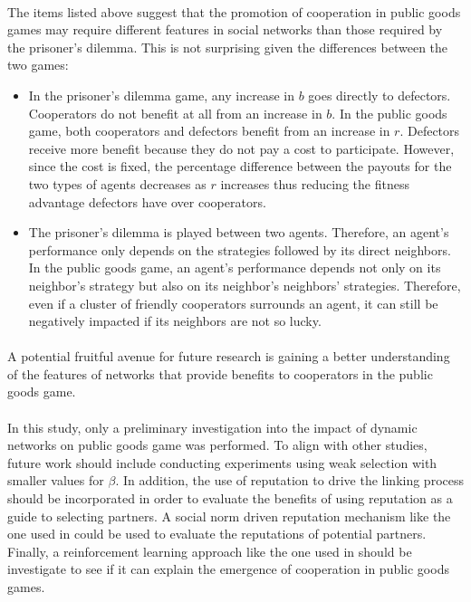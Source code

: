 \documentclass{article}
\begin{document}
	\paragraph{}The items listed above suggest that the promotion of cooperation in public goods games may require different features in social networks than those required by the prisoner's dilemma.  This is not surprising given the differences between the two games:

	\begin{itemize}
		\item In the prisoner's dilemma game, any increase in $b$ goes directly to defectors.  Cooperators do not benefit at all from an increase in $b$.  In the public goods game, both cooperators and defectors benefit from an increase in $r$.  Defectors receive more benefit because they do not pay a cost to participate.  However, since the cost is fixed, the percentage difference between the payouts for the two types of agents decreases as $r$ increases thus reducing the fitness advantage defectors have over cooperators.
		\item The prisoner's dilemma is played between two agents.  Therefore, an agent's performance only depends on the strategies followed by its direct neighbors.  In the public goods game, an agent's performance depends not only on its neighbor's strategy but also on its neighbor's neighbors' strategies.  Therefore, even if a cluster of friendly cooperators surrounds an agent, it can still be negatively impacted if its neighbors are not so lucky.
	\end{itemize}

	\paragraph{} A potential fruitful avenue for future research is gaining a better understanding of the features of networks that provide benefits to cooperators in the public goods game.
	\paragraph{}In this study, only a preliminary investigation into the impact of dynamic networks on public goods game was performed.  To align with other studies, future work should include conducting experiments using weak selection with smaller values for $\beta$.  In addition, the use of reputation to drive the linking process should be incorporated in order to evaluate the benefits of using reputation as a guide to selecting partners.  A social norm driven reputation mechanism like the one used in \cite{Maloney2015a} could be used to evaluate the reputations of potential partners.  Finally, a reinforcement learning approach like the one used in \cite{Macy1991} should be investigate to see if it can explain the emergence of cooperation in public goods games.

    
    
\end{document}
